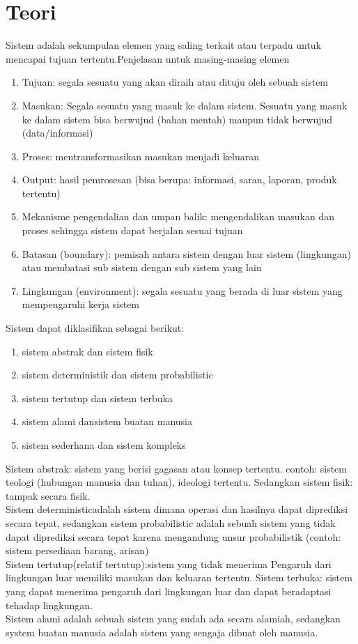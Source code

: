 \documentclass[a4paper,12pt]{article}
\begin{document}
\section{Teori}
Sistem adalah sekumpulan elemen yang saling terkait atau terpadu untuk mencapai tujuan tertentu.Penjelasan untuk
masing-masing elemen
\begin{enumerate}
    \item Tujuan: segala sesuatu yang akan diraih atau dituju oleh sebuah sistem 
    \item Masukan: Segala sesuatu yang masuk ke dalam sistem. Sesuatu yang masuk ke dalam sistem bisa
        berwujud (bahan mentah) maupun tidak berwujud (data/informasi)
    \item Proses: mentransformasikan masukan menjadi keluaran
    \item Output: hasil pemrosesan (bisa berupa: informasi, saran, laporan, produk tertentu)
    \item Mekanisme pengendalian dan umpan balik: mengendalikan masukan dan proses sehingga sistem dapat berjalan sesuai tujuan
    \item Batasan (boundary): pemisah antara sistem dengan luar sistem (lingkungan) atau membatasi sub
        sistem dengan sub sistem yang lain
    \item Lingkungan (environment): segala sesuatu yang berada di luar sistem yang mempengaruhi kerja sistem 
\end{enumerate}

Sistem dapat diklasifikan sebagai berikut:
\begin{enumerate}
   \item sistem abstrak dan sistem fisik
   \item sistem deterministik dan sistem probabilistic
   \item sistem tertutup dan sistem terbuka
   \item sistem alami dansistem buatan manusia
   \item sistem sederhana dan sistem kompleks 
\end{enumerate}

Sistem abstrak: sistem yang berisi gagasan atau konsep tertentu. contoh: sistem teologi (hubungan manusia dan tuhan),
ideologi tertentu. Sedangkan sistem fisik: tampak secara fisik.\\
Sistem    deterministicadalah  sistem  dimana  operasi    dan    hasilnya    dapat    diprediksi  secara    tepat,
sedangkan sistem probabilistic adalah sebuah sistem yang tidak dapat diprediksi secara tepat karena mengandung
unsur probabilistik (contoh: sistem persediaan barang, arisan)\\
Sistem tertutup(relatif tertutup):sistem yang tidak menerima Pengaruh dari lingkungan luar memiliki
masukan dan keluaran tertentu. Sistem terbuka: sistem yang dapat menerima pengaruh dari lingkungan  
luar dan dapat beradaptasi tehadap lingkungan.\\
Sistem alami adalah sebuah sistem yang sudah ada secara alamiah, sedangkan system buatan manusia adalah sistem yang
sengaja dibuat oleh manusia.
\newpage
\end{document}

